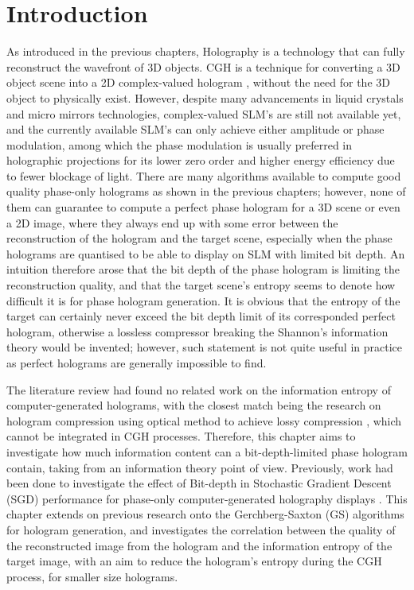 \section{Introduction}
	As introduced in the previous chapters, Holography is a technology that can fully reconstruct the wavefront of 3D objects. CGH is a technique for converting a 3D object scene into a 2D complex-valued hologram \cite{Tsang2018}, without the need for the 3D object to physically exist. However, despite many advancements in liquid crystals and micro mirrors technologies, complex-valued SLM's are still not available yet, and the currently available SLM's can only achieve either amplitude or phase modulation, among which the phase modulation is usually preferred in holographic projections for its lower zero order and higher energy efficiency due to fewer blockage of light. There are many algorithms available to compute good quality phase-only holograms as shown in the previous chapters; however, none of them can guarantee to compute a perfect phase hologram for a 3D scene or even a 2D image, where they always end up with some error between the reconstruction of the hologram and the target scene, especially when the phase holograms are quantised to be able to display on SLM with limited bit depth. An intuition therefore arose that the bit depth of the phase hologram is limiting the reconstruction quality, and that the target scene's entropy seems to denote how difficult it is for phase hologram generation. It is obvious that the entropy of the target can certainly never exceed the bit depth limit of its corresponded perfect hologram, otherwise a lossless compressor breaking the Shannon's information theory \cite{Shannon1948} would be invented; however, such statement is not quite useful in practice as perfect holograms are generally impossible to find.

	The literature review had found no related work on the information entropy of computer-generated holograms, with the closest match being the research on hologram compression using optical method to achieve lossy compression \cite{Kollin1988}, which cannot be integrated in CGH processes. Therefore, this chapter aims to investigate how much information content can a bit-depth-limited phase hologram contain, taking from an information theory point of view. Previously, work had been done to investigate the effect of Bit-depth in Stochastic Gradient Descent (SGD) performance for phase-only computer-generated holography displays \cite{Kadis2022}. This chapter extends on previous research onto the Gerchberg-Saxton (GS) \cite{Gerchberg1972} algorithms for hologram generation, and investigates the correlation between the quality of the reconstructed image from the hologram and the information entropy of the target image, with an aim to reduce the hologram's entropy during the CGH process, for smaller size holograms.


